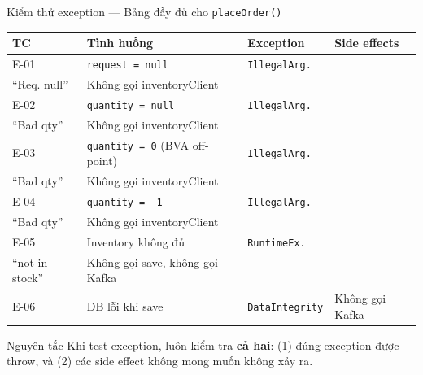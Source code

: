 \documentclass[aspectratio=169,10pt]{beamer}
\begin{document}
\begin{frame}[fragile]{Kiểm thử exception --- Bảng đầy đủ cho \texttt{placeOrder()}}
  \begin{center}
  \scriptsize
  \begin{tabular}{p{1.1cm}p{3.4cm}p{3.0cm}p{3.0cm}}
    \toprule
    \textbf{TC} & \textbf{Tình huống} & \textbf{Exception} & \textbf{Side effects} \\
    \midrule
    E-01 & \texttt{request = null} &
      \texttt{IllegalArg.}\\``Req. null'' &
      Không gọi inventoryClient \\
    E-02 & \texttt{quantity = null} &
      \texttt{IllegalArg.}\\``Bad qty'' &
      Không gọi inventoryClient \\
    E-03 & \texttt{quantity = 0} (BVA off-point) &
      \texttt{IllegalArg.}\\``Bad qty'' &
      Không gọi inventoryClient \\
    E-04 & \texttt{quantity = -1} &
      \texttt{IllegalArg.}\\``Bad qty'' &
      Không gọi inventoryClient \\
    E-05 & Inventory không đủ &
      \texttt{RuntimeEx.}\\``not in stock'' &
      Không gọi save, không gọi Kafka \\
    E-06 & DB lỗi khi save &
      \texttt{DataIntegrity} &
      Không gọi Kafka \\
    \bottomrule
  \end{tabular}
  \end{center}

  \begin{alertblock}{Nguyên tắc}
    Khi test exception, luôn kiểm tra \textbf{cả hai}:
    (1) đúng exception được throw, và (2) các side effect không
    mong muốn không xảy ra.
  \end{alertblock}
\end{frame}
\end{document}
